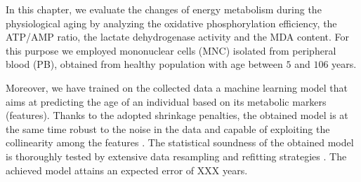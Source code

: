 In this chapter, we evaluate the changes of energy metabolism during the physiological aging by analyzing the oxidative phosphorylation efficiency, the ATP/AMP ratio, the lactate dehydrogenase activity and the MDA content.  For this purpose we employed mononuclear cells (MNC) isolated from peripheral blood (PB), obtained from healthy population with age between $5$ and $106$ years.

Moreover, we have trained on the collected data a machine learning model that aims at predicting the age of an individual based on its metabolic markers (features). Thanks to the adopted shrinkage penalties, the obtained model is at the same time robust to the noise in the data and capable of exploiting the collinearity among the features \cite{hastie2009elements}. The statistical soundness of the obtained model is thoroughly tested by extensive data resampling and refitting strategies \cite{molinaro2005prediction}. The achieved model attains an expected error of XXX years.
